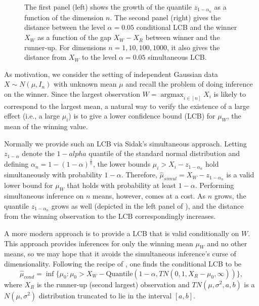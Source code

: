 \documentclass{article}
\DeclareMathOperator*{\argmax}{argmax}
\begin{document}
\begin{figure}
{\begin{minipage}{0.35\textwidth}
    \end{minipage}
    }
    \caption{ The first panel (left) shows the growth of the quantile $z_{1 - \alpha_n}$ as a function of the dimension $n$. The second panel (right) gives the distance between the level $\alpha=0.05$ conditional LCB and the winner $X_W$ as a function of the gap $X_W - X_R$ between winner and the runner-up. For dimensions $n=1,10,100,1000$, it also gives the distance from $X_W$ to the level $\alpha=0.05$ simultaneous LCB.}
    \label{fig:winner}
\end{figure}

As motivation, we consider the setting of independent Gaussian data $X \sim N(\mu, I_n)$ with unknown mean $\mu$ and recall the problem of doing inference on the winner. Since the largest observation $W = \argmax_{i \in [n]} X_i$ is likely to correspond to the largest mean, a natural way to verify the existence of a large effect (i.e., a large $\mu_i$) is to give a lower confidence bound (LCB) for $\mu_W$, the mean of the winning value. 

Normally we provide such an LCB via Sidak's simultaneous approach. Letting $z_{1-\alpha}$ denote the $1-alpha$ quantile of the standard normal distribution and defining $\alpha_n = 1 - (1-\alpha)^\frac{1}{n}$, the lower bounds $ \mu_i > X_i - z_{1 - \alpha_n}$ hold simultaneously with probability $1-\alpha$. Therefore, $\hat{\mu}_{simul} = X_W - z_{1 - \alpha_n}$ is a valid lower bound for $\mu_W$ that holds with probability at least $1-\alpha$. Performing simultaneous inference on $n$ means, however, comes at a cost. As $n$ grows, the quantile $z_{1 - \alpha_n}$ grows as well (depicted in the left panel of ), and the distance from the winning observation to the LCB correspondingly increases. 

A more modern approach is to provide a LCB that is valid conditionally on $W$. This approach provides inferences for only the winning mean $\mu_W$ and no other means, so we may hope that it avoids the simultaneous inference's curse of dimensionality. Following the recipe of \cite{Fithian2017}, one finds the conditional LCB to be 
\begin{equation}
    \label{eq:motivating_lcb}
    \hat{\mu}_{cond} = \inf \{\mu_0 : \mu_0 > X_W - \text{Quantile}(1-\alpha, TN(0, 1, X_R - \mu_0, \infty))  \},
\end{equation}
where $X_R$ is the runner-up (second largest) observation and $TN(\mu, \sigma^2, a, b)$ is a $N(\mu, \sigma^2)$ distribution truncated to lie in the interval $[a, b]$. 
\end{document}
